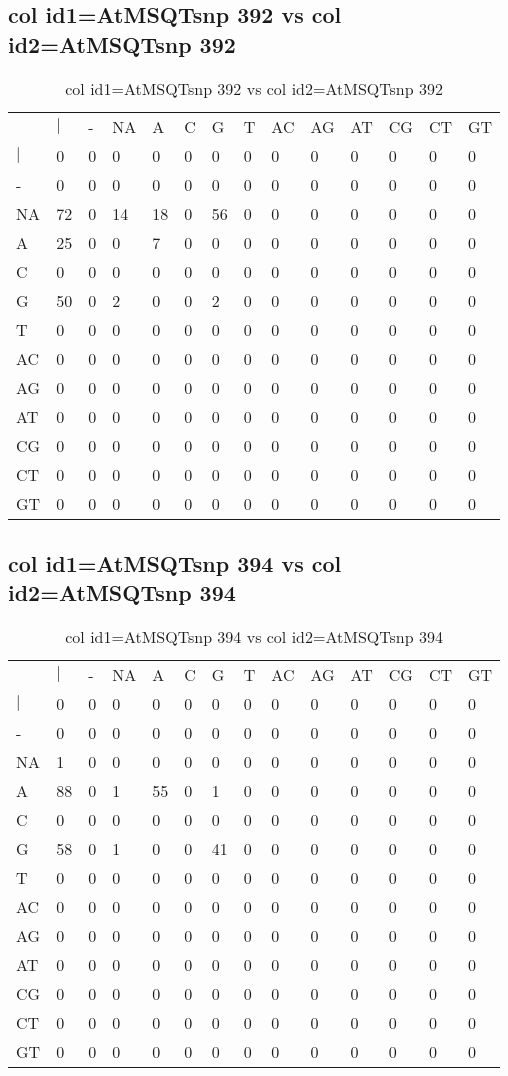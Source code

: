 \subsection{col id1=AtMSQTsnp 392 vs col id2=AtMSQTsnp 392}
\begin{center}
\begin{longtable}{|l|l|l|l|l|l|l|l|l|l|l|l|l|l|}
\caption{col id1=AtMSQTsnp 392 vs col id2=AtMSQTsnp 392} \label{table_dm710}\\
\hline
\\
\hline
&$|$&-&NA&A&C&G&T&AC&AG&AT&CG&CT&GT\\
$|$&0&0&0&0&0&0&0&0&0&0&0&0&0\\
-&0&0&0&0&0&0&0&0&0&0&0&0&0\\
NA&72&0&14&18&0&56&0&0&0&0&0&0&0\\
A&25&0&0&7&0&0&0&0&0&0&0&0&0\\
C&0&0&0&0&0&0&0&0&0&0&0&0&0\\
G&50&0&2&0&0&2&0&0&0&0&0&0&0\\
T&0&0&0&0&0&0&0&0&0&0&0&0&0\\
AC&0&0&0&0&0&0&0&0&0&0&0&0&0\\
AG&0&0&0&0&0&0&0&0&0&0&0&0&0\\
AT&0&0&0&0&0&0&0&0&0&0&0&0&0\\
CG&0&0&0&0&0&0&0&0&0&0&0&0&0\\
CT&0&0&0&0&0&0&0&0&0&0&0&0&0\\
GT&0&0&0&0&0&0&0&0&0&0&0&0&0\\
\hline
\end{longtable}
\end{center}

\subsection{col id1=AtMSQTsnp 394 vs col id2=AtMSQTsnp 394}
\begin{center}
\begin{longtable}{|l|l|l|l|l|l|l|l|l|l|l|l|l|l|}
\caption{col id1=AtMSQTsnp 394 vs col id2=AtMSQTsnp 394} \label{table_dm712}\\
\hline
\\
\hline
&$|$&-&NA&A&C&G&T&AC&AG&AT&CG&CT&GT\\
$|$&0&0&0&0&0&0&0&0&0&0&0&0&0\\
-&0&0&0&0&0&0&0&0&0&0&0&0&0\\
NA&1&0&0&0&0&0&0&0&0&0&0&0&0\\
A&88&0&1&55&0&1&0&0&0&0&0&0&0\\
C&0&0&0&0&0&0&0&0&0&0&0&0&0\\
G&58&0&1&0&0&41&0&0&0&0&0&0&0\\
T&0&0&0&0&0&0&0&0&0&0&0&0&0\\
AC&0&0&0&0&0&0&0&0&0&0&0&0&0\\
AG&0&0&0&0&0&0&0&0&0&0&0&0&0\\
AT&0&0&0&0&0&0&0&0&0&0&0&0&0\\
CG&0&0&0&0&0&0&0&0&0&0&0&0&0\\
CT&0&0&0&0&0&0&0&0&0&0&0&0&0\\
GT&0&0&0&0&0&0&0&0&0&0&0&0&0\\
\hline
\end{longtable}
\end{center}

